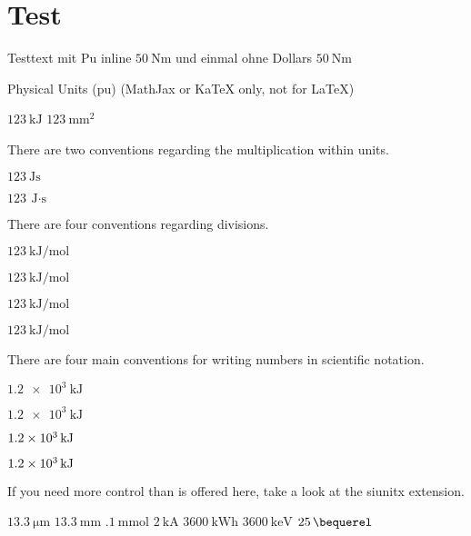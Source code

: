 \documentclass{article}
\begin{document}
\section{Test}\label{test}

Testtext mit Pu inline \(\qty{50 }{\N\meter }\) und einmal ohne Dollars
\(\qty{50 }{\N\meter }\)

Physical Units (pu) (MathJax or KaTeX only, not for LaTeX)

\(\qty{123 }{\kJ }\) \(\qty{123 }{\mm\squared }\)

There are two conventions regarding the multiplication within units.

\(\qty{123 }{\J \s }\)

\(\qty{123 }{\J \cdot\s }\)

There are four conventions regarding divisions.

\(\qty{123 }{\kJ \per\mol  }\)

\(\qty{123 }{\kJ \per\mol  }\)

\(\qty{123 }{\kJ \per\mol  }\)

\(\qty{123 }{\kJ \per\mol  }\)

There are four main conventions for writing numbers in scientific
notation.

\(\qty{1.2e3 }{\kJ }\)

\(\qty{1,2e3 }{\kJ }\)

\(\qty{1.2E3 }{\kJ }\)

\(\qty{1,2E3 }{\kJ }\)

If you need more control than is offered here, take a look at the
siunitx extension.

\(\qty{13.3 }{\micro \meter }\) \(\qty{13.3 }{\mm }\)
\(\qty{.1 }{\mmol }\) \(\qty{2 }{\kA }\) \(\qty{3600 }{\kWh }\)
\(\qty{3600 }{\keV }\) \(\qty{25 }{\bequerel }\)
\end{document}
